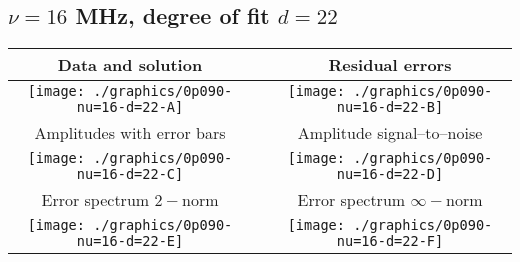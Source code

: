 

% 

\clearpage{}
\break{}

\subsection{$\nu = 16$ MHz, degree of fit $d = 22$}

\begin{table}[h]
    \begin{center}
        \begin{tabular}{ccc}
            Data and solution & \quad & Residual errors \\\hline
            \texttt{[image: ./graphics/0p090-nu=16-d=22-A]} &&
            \texttt{[image: ./graphics/0p090-nu=16-d=22-B]} \\[15pt]
            Amplitudes with error bars && Amplitude signal--to--noise \\\hline
            \texttt{[image: ./graphics/0p090-nu=16-d=22-C]} &&
            \texttt{[image: ./graphics/0p090-nu=16-d=22-D]} \\[15pt]
            Error spectrum $2-$norm && Error spectrum $\infty-$norm \\\hline
            \texttt{[image: ./graphics/0p090-nu=16-d=22-E]} &&
            \texttt{[image: ./graphics/0p090-nu=16-d=22-F]} \\[15pt]
        \end{tabular}
    \end{center}
\label{fig:elev=90, nu=16}
\end{table}



\endinput
